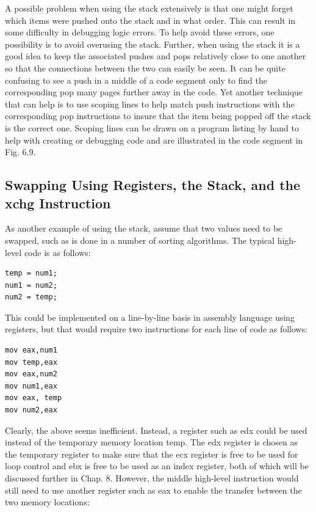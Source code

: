 \documentclass[10pt]{article}
\begin{document}
A possible problem when using the stack extensively is that one might forget which items were pushed onto the stack and in what order. This can result in some difficulty in debugging logic errors. To help avoid these errors, one possibility is to avoid overusing the stack. Further, when using the stack it is a good idea to keep the associated pushes and pops relatively close to one another so that the connections between the two can easily be seen. It can be quite confusing to see a push in a middle of a code segment only to find the corresponding pop many pages further away in the code. Yet another technique that can help is to use scoping lines to help match push instructions with the corresponding pop instructions to insure that the item being popped off the stack is the correct one. Scoping lines can be drawn on a program listing by hand to help with creating or debugging code and are illustrated in the code segment in Fig. 6.9.

\subsection*{Swapping Using Registers, the Stack, and the xchg Instruction}
As another example of using the stack, assume that two values need to be swapped, such as is done in a number of sorting algorithms. The typical high-level code is as follows:

\begin{verbatim}
temp = num1;
num1 = num2;
num2 = temp;
\end{verbatim}

This could be implemented on a line-by-line basis in assembly language using registers, but that would require two instructions for each line of code as follows:

\begin{verbatim}
mov eax,num1
mov temp,eax
mov eax,num2
mov num1,eax
mov eax, temp
mov num2,eax
\end{verbatim}

Clearly, the above seems inefficient. Instead, a register such as edx could be used instead of the temporary memory location temp. The edx register is chosen as the temporary register to make sure that the ecx register is free to be used for loop control and ebx is free to be used as an index register, both of which will be discussed further in Chap. 8. However, the middle high-level instruction would still need to use another register such as eax to enable the transfer between the two memory locations:
\end{document}
